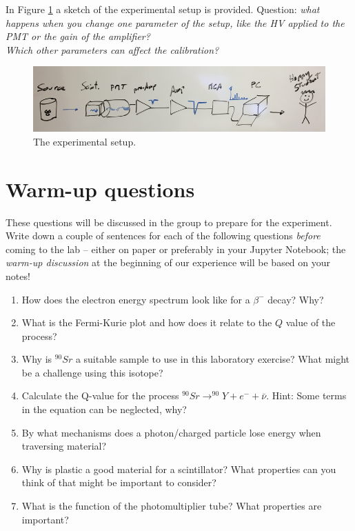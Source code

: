 \documentclass[a4,11pt, notitlepage]{article}
\begin{document}
In Figure \ref{fig:setup} a sketch of the experimental setup is provided. 
Question: \emph{what happens when you change one parameter of the setup, like the HV applied to the PMT or the gain of the amplifier? \\
Which other parameters can affect the calibration?}

\begin{figure}[htbp]
  \begin{center}
    \includegraphics[width=15.0cm]{figures/setup.png}
    \caption{The experimental setup.}
\label{fig:setup}
  \end{center}
\end{figure}

\section{Warm-up questions}
\label{sec:warm-up-questions}

These questions will be discussed in the group to prepare for the experiment.
Write down a couple of sentences for each of the following questions
\emph{before} coming to the lab -- either on paper or preferably in your Jupyter
Notebook; the \emph{warm-up discussion} at the beginning of our experience will be based on your notes!

\begin{enumerate}
\item How does the electron energy spectrum look like for a $\beta^-$ decay?
  Why?
\item What is the Fermi-Kurie plot and how does it relate to the $Q$ value of
  the process?
\item Why is $^{90}Sr$ a suitable sample to use in this laboratory exercise?
  What might be a challenge using this isotope?
\item Calculate the Q-value for the process $^{90}Sr\rightarrow ^{90}Y + e^- +
  \bar{\nu}$. Hint: Some terms in the equation can be neglected, why? 
\item By what mechanisms does a photon/charged particle lose energy
  when traversing material?
\item Why is plastic a good material for a scintillator? What
  properties can you think of that might be important to consider?
\item What is the function of the photomultiplier tube? What properties are important?
\end{enumerate}
\end{document}

